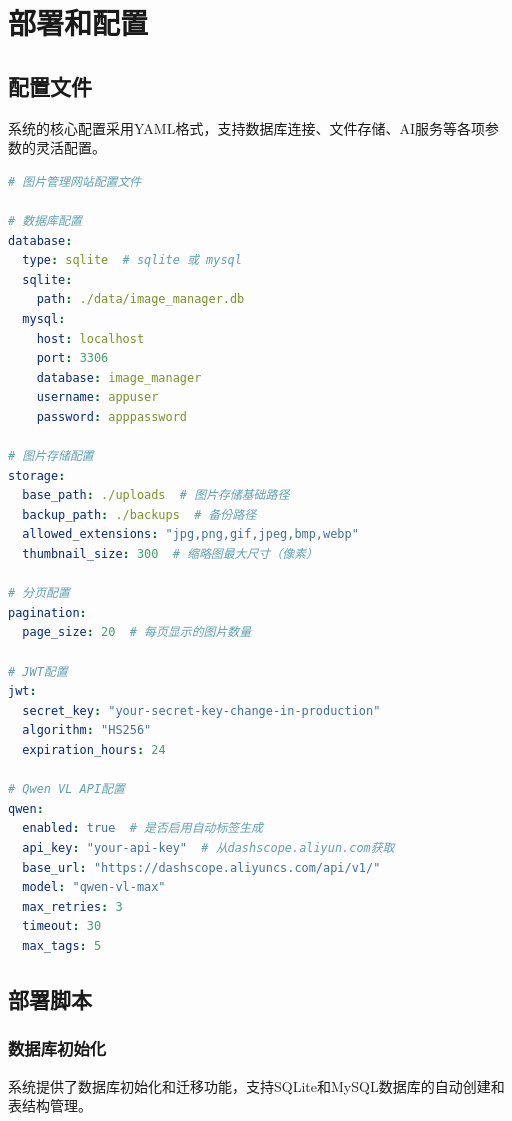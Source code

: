\documentclass[cs4size,a4paper]{ctexart}
\numberwithin{equation}{section}
\numberwithin{table}{section}
\numberwithin{figure}{section}
\begin{document}
\newpage

\section{部署和配置}

\subsection{配置文件}

系统的核心配置采用YAML格式，支持数据库连接、文件存储、AI服务等各项参数的灵活配置。

\begin{lstlisting}[language=YAML,caption=系统核心配置文件]
# 图片管理网站配置文件

# 数据库配置
database:
  type: sqlite  # sqlite 或 mysql
  sqlite:
    path: ./data/image_manager.db
  mysql:
    host: localhost
    port: 3306
    database: image_manager
    username: appuser
    password: apppassword

# 图片存储配置
storage:
  base_path: ./uploads  # 图片存储基础路径
  backup_path: ./backups  # 备份路径
  allowed_extensions: "jpg,png,gif,jpeg,bmp,webp"
  thumbnail_size: 300  # 缩略图最大尺寸（像素）

# 分页配置
pagination:
  page_size: 20  # 每页显示的图片数量

# JWT配置
jwt:
  secret_key: "your-secret-key-change-in-production"
  algorithm: "HS256"
  expiration_hours: 24

# Qwen VL API配置
qwen:
  enabled: true  # 是否启用自动标签生成
  api_key: "your-api-key"  # 从dashscope.aliyun.com获取
  base_url: "https://dashscope.aliyuncs.com/api/v1/"
  model: "qwen-vl-max"
  max_retries: 3
  timeout: 30
  max_tags: 5
\end{lstlisting}

\subsection{部署脚本}

\subsubsection{数据库初始化}

系统提供了数据库初始化和迁移功能，支持SQLite和MySQL数据库的自动创建和表结构管理。
\end{document}
